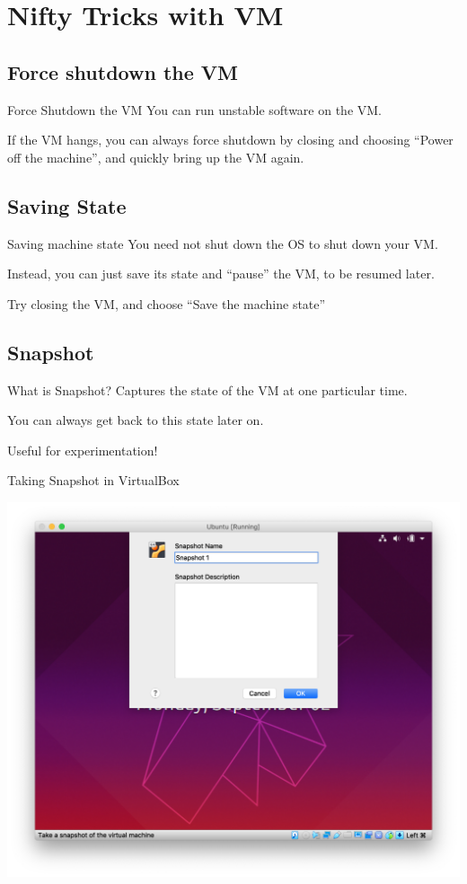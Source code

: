 \documentclass[11pt]{beamer}
\begin{document}
\section{Nifty Tricks with VM}
\subsection{Force shutdown the VM}
\begin{frame}{Force Shutdown the VM}
  You can run unstable software on the VM.

  If the VM hangs, you can always force shutdown by closing and choosing ``Power off the machine'', and quickly bring up the VM again.
\end{frame}

\subsection{Saving State}
\begin{frame}{Saving machine state}
  You need not shut down the OS to shut down your VM.

  Instead, you can just save its state and ``pause'' the VM, to be resumed later.

  Try closing the VM, and choose ``Save the machine state''
\end{frame}

\subsection{Snapshot}
\begin{frame}{What is Snapshot?}
  Captures the state of the VM at one particular time.

  You can always get back to this state later on.

  Useful for experimentation!
\end{frame}

\begin{frame}{Taking Snapshot in VirtualBox}
  \begin{center}
    \includegraphics[width=0.7\linewidth]{snapshot}
  \end{center}
\end{frame}
\end{document}
